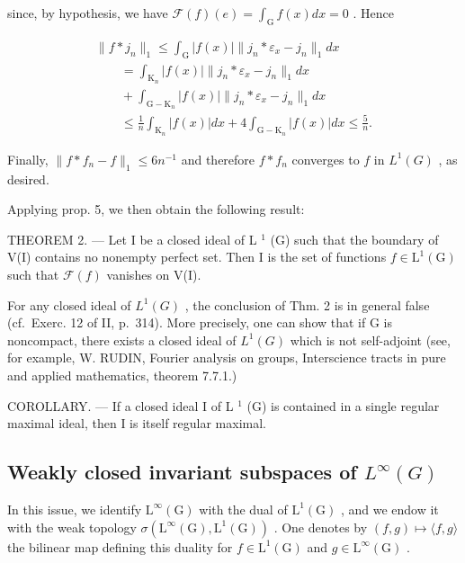 since, by hypothesis, we have \(\mathcal{F}(f)(e) = \int_{\mathrm{G}} f(x) dx = 0\) . Hence

\[
\begin{array}{l} \| f * j _ {n} \| _ {1} \leqslant \int_ {\mathrm{G}} | f (x) | \| j _ {n} * \varepsilon_ {x} - j _ {n} \| _ {1} d x \\ \qquad = \int_ {\mathrm{K} _ {n}} | f (x) | \| j _ {n} * \varepsilon_ {x} - j _ {n} \| _ {1} d x \\ \qquad + \int_ {\mathrm{G-K} _ {n}} | f (x) | \| j _ {n} * \varepsilon_ {x} - j _ {n} \| _ {1} d x \\ \qquad \leqslant \frac {1}{n} \int_ {\mathrm{K} _ {n}} | f (x) | d x + 4 \int_ {\mathrm{G-K} _ {n}} | f (x) | d x \leqslant \frac {5}{n}. \end{array}
\]

Finally, \(\|f * f_{n} - f\|_{1} \leqslant 6n^{-1}\) and therefore \(f * f_{n}\) converges to \(f\) in \(L^{1}(G)\) , as desired.

Applying prop. 5, we then obtain the following result:

THEOREM 2. --- Let I be a closed ideal of L \(^{1}\) (G) such that the boundary of V(I) contains no nonempty perfect set. Then I is the set of functions \(f \in \text{L}^{1}(\text{G})\) such that \(\mathcal{F}(f)\) vanishes on V(I).

For any closed ideal of \(L^{1}(G)\) , the conclusion of Thm. 2 is in general false (cf.~Exerc. 12 of II, p.~314). More precisely, one can show that if G is noncompact, there exists a closed ideal of \(L^{1}(G)\) which is not self-adjoint (see, for example, W. RUDIN, Fourier analysis on groups, Interscience tracts in pure and applied mathematics, theorem 7.7.1.)

COROLLARY. --- If a closed ideal I of L \(^{1}\) (G) is contained in a single regular maximal ideal, then I is itself regular maximal.

\subsection{\texorpdfstring{Weakly closed invariant subspaces of \(L^{\infty}(G)\)}{Weakly closed invariant subspaces of L\^{}\{\textbackslash infinity\}(G)}}

In this issue, we identify \(\mathrm{L}^{\infty}(\mathrm{G})\) with the dual of \(\mathrm{L}^{1}(\mathrm{G})\) , and we endow it with the weak topology \(\sigma(\mathrm{L}^{\infty}(\mathrm{G}),\mathrm{L}^{1}(\mathrm{G}))\) . One denotes by \((f,g)\mapsto\langle f,g\rangle\) the bilinear map defining this duality for \(f\in\mathrm{L}^{1}(\mathrm{G})\) and \(g\in\mathrm{L}^{\infty}(\mathrm{G})\) .

